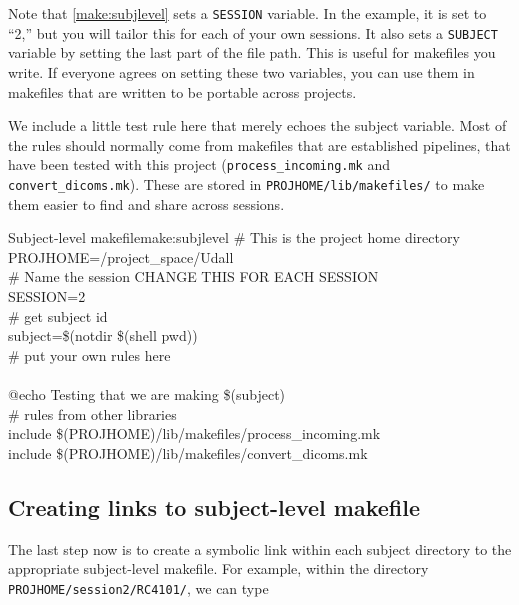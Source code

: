 Note that \autoref{make:subjlevel} sets a \texttt{SESSION} variable. In the example, it is set to ``2,'' but you will tailor this for each of your own sessions. It also sets a \texttt{SUBJECT} variable by setting the last part of the file path. This is useful for makefiles you write. If everyone agrees on setting these two variables, you can use them in makefiles that are written to be portable across projects.

We include a little test rule here that merely echoes the subject variable. Most of the rules should normally come from makefiles that are established pipelines, that have been tested with this project (\texttt{process_incoming.mk} and \texttt{convert_dicoms.mk}). These are stored in \texttt{PROJHOME/lib/makefiles/} to make them easier to find and share across sessions.

\begin{make}{Subject-level makefile}{make:subjlevel}
	\# This is the project home directory \\	
	PROJHOME=/project_space/Udall \\
	
	\# Name the session CHANGE THIS FOR EACH SESSION \\	
	SESSION=2 \\
		
	\# get subject id \\
	subject=\$(notdir \$(shell pwd)) \\
	
	\# put your own rules here\\
	
		\\
	\tab @echo Testing that we are making \$(subject) \\
	
	\# rules from other libraries \\	
	include \$(PROJHOME)/lib/makefiles/process_incoming.mk \\	
	include \$(PROJHOME)/lib/makefiles/convert_dicoms.mk
\end{make}

\subsection{Creating links to subject-level makefile}
The last step now is to create a symbolic link within each subject directory to the appropriate subject-level makefile. For example, within the directory \texttt{PROJHOME/session2/RC4101/}, we can type

